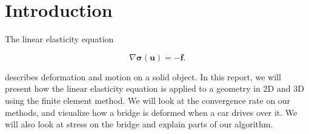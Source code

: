 \section{Introduction}



The linear elasticity equation

\begin{equation}
\label{eq:linEl}
\nabla \bm{\sigma}(\bm{u}) = - \bm{f}.
\end{equation}

describes deformation and motion on a solid object. In this report, we will present how the linear elasticity equation is applied to a geometry in 2D and 3D using the finite element method. We will look at the convergence rate on our methods, and visualize how a bridge is deformed when a car drives over it. We will also look at stress on the bridge and explain parts of our algorithm. 
